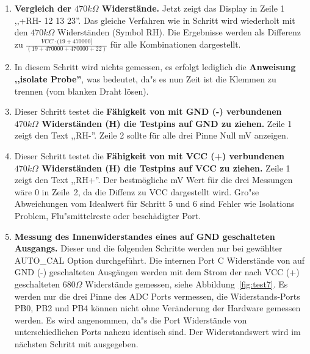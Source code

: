 \begin{enumerate}
\item {\bf Vergleich der \(470k\Omega\) Widerst\"ande.}
Jetzt zeigt das Display in Zeile 1 ,,+RH- 12 13 23''. Das gleiche Verfahren wie in Schritt wird wiederholt mit den
 \(470k\Omega\) Widerst\"anden (Symbol RH).
Die Ergebnisse werden als Differenz zu  \(\frac{VCC \cdot (19 + 470000]}{ (19 + 470000 + 470000 + 22)} \) f\"ur alle Kombinationen dargestellt.
\item In diesem Schritt wird nichts gemessen, es erfolgt lediglich die {\bf Anweisung ,,isolate Probe''},
was bedeutet, da"s es nun Zeit ist die Klemmen zu trennen (vom blanken Draht l\"osen).
\item Dieser Schritt testet die {\bf F\"ahigkeit von mit GND (-) verbundenen \(470k\Omega\) Widerst\"anden (H) die Testpins auf GND zu ziehen.}
Zeile 1 zeigt den Text ,,RH-''.
Zeile 2 sollte f\"ur alle drei Pinne  Null mV anzeigen.
\item Dieser Schritt testet die {\bf F\"ahigkeit von mit VCC (+) verbundenen \(470k\Omega\) Widerst\"anden (H) die Testpins auf VCC zu ziehen.}
Zeile 1 zeigt den Text ,,RH+''.
Der bestm\"ogliche mV Wert f\"ur die drei Messungen w\"are 0 in Zeile~2, da die Diffenz zu VCC dargestellt wird.
 Gro"se Abweichungen vom Idealwert f\"ur Schritt 5 und 6 sind Fehler wie Isolations Problem, Flu"smittelreste oder besch\"adigter Port.
\item {\bf Messung des Innenwiderstandes eines auf GND geschalteten Ausgangs.}
Dieser und die folgenden Schritte werden nur bei gew\"ahlter AUTO\_CAL Option durchgef\"uhrt.
Die internen Port C Widerst\"ande von auf GND (-) geschalteten Ausg\"angen werden mit dem Strom
der nach VCC (+) geschalteten \(680\Omega\) Widerst\"ande gemessen, siehe Abbildung~\ref{fig:test7}.
Es werden nur die drei Pinne des ADC Ports vermessen, die Widerstands-Ports  PB0, PB2 und PB4 k\"onnen nicht
ohne Ver\"anderung der Hardware gemessen werden.
Es wird angenommen, da"s die Port Widerst\"ande von unterschiedlichen Ports nahezu identisch sind.
Der Widerstandswert wird im n\"achsten Schritt mit ausgegeben.
\begin{figure}[H]
\centering

\end{figure}
\end{enumerate}
